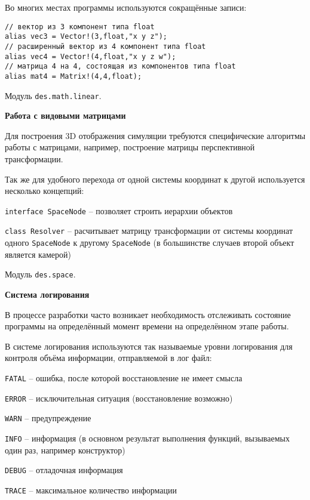 Во многих местах программы используются сокращённые записи:
\begin{verbatim}
// вектор из 3 компонент типа float
alias vec3 = Vector!(3,float,"x y z");
// расширенный вектор из 4 компонент типа float
alias vec4 = Vector!(4,float,"x y z w");
// матрица 4 на 4, состоящая из компонентов типа float
alias mat4 = Matrix!(4,4,float);
\end{verbatim}

Модуль \verb|des.math.linear|.

\textbf{Работа с видовыми матрицами}

Для построения 3D отображения симуляции требуются специфические алгоритмы работы
с матрицами, например, построение матрицы перспективной трансформации.

Так же для удобного перехода от одной системы координат к другой используется 
несколько концепций:

\begin{mintemize}
\item \verb|interface SpaceNode| -- позволяет строить иерархии объектов
\item \verb|class Resolver| -- расчитывает матрицу трансформации от системы координат
    одного \verb|SpaceNode| к другому \verb|SpaceNode| (в большинстве случаев второй объект
    является камерой)
\end{mintemize}

Модуль \verb|des.space|.

\textbf{Система логирования}

В процессе разработки часто возникает необходимость отслеживать состояние
программы на определённый момент времени на определённом этапе работы.

В системе логирования используются так называемые уровни логирования
для контроля объёма информации, отправляемой в лог файл:

\begin{mintemize}
\item \verb|FATAL| -- ошибка, после которой восстановление не имеет смысла
\item \verb|ERROR| -- исключительная ситуация (восстановление возможно)
\item \verb|WARN| -- предупреждение
\item \verb|INFO| -- информация (в основном результат выполнения функций, вызываемых один раз, например конструктор)
\item \verb|DEBUG| -- отладочная информация
\item \verb|TRACE| -- максимальное количество информации
\end{mintemize}

